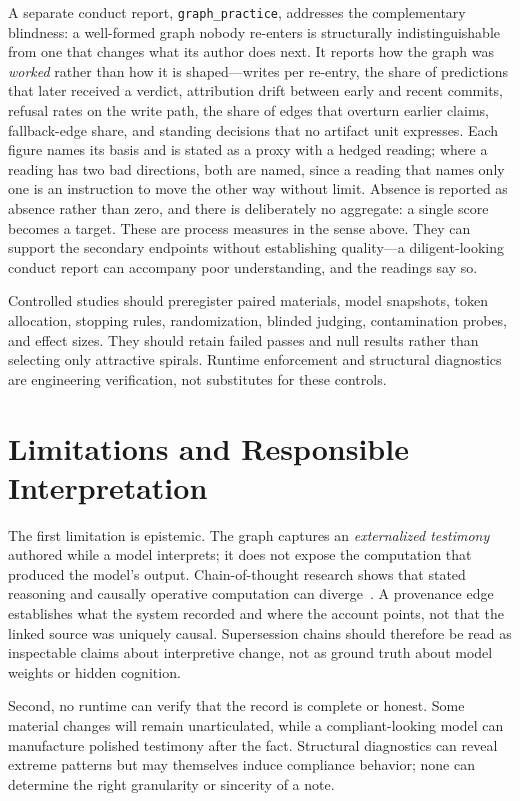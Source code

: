 A separate conduct report, \texttt{graph\_practice}, addresses the complementary blindness: a well-formed graph nobody re-enters is structurally indistinguishable from one that changes what its author does next. It reports how the graph was \emph{worked} rather than how it is shaped---writes per re-entry, the share of predictions that later received a verdict, attribution drift between early and recent commits, refusal rates on the write path, the share of edges that overturn earlier claims, fallback-edge share, and standing decisions that no artifact unit expresses. Each figure names its basis and is stated as a proxy with a hedged reading; where a reading has two bad directions, both are named, since a reading that names only one is an instruction to move the other way without limit. Absence is reported as absence rather than zero, and there is deliberately no aggregate: a single score becomes a target. These are process measures in the sense above. They can support the secondary endpoints without establishing quality---a diligent-looking conduct report can accompany poor understanding, and the readings say so.

Controlled studies should preregister paired materials, model snapshots, token allocation, stopping rules, randomization, blinded judging, contamination probes, and effect sizes. They should retain failed passes and null results rather than selecting only attractive spirals. Runtime enforcement and structural diagnostics are engineering verification, not substitutes for these controls.

\section{Limitations and Responsible Interpretation}
\label{sec:limitations}

The first limitation is epistemic. The graph captures an \emph{externalized testimony} authored while a model interprets; it does not expose the computation that produced the model's output. Chain-of-thought research shows that stated reasoning and causally operative computation can diverge~\cite{turpin2023faithful, lanham2023measuring}. A provenance edge establishes what the system recorded and where the account points, not that the linked source was uniquely causal. Supersession chains should therefore be read as inspectable claims about interpretive change, not as ground truth about model weights or hidden cognition.

Second, no runtime can verify that the record is complete or honest. Some material changes will remain unarticulated, while a compliant-looking model can manufacture polished testimony after the fact. Structural diagnostics can reveal extreme patterns but may themselves induce compliance behavior; none can determine the right granularity or sincerity of a note.

